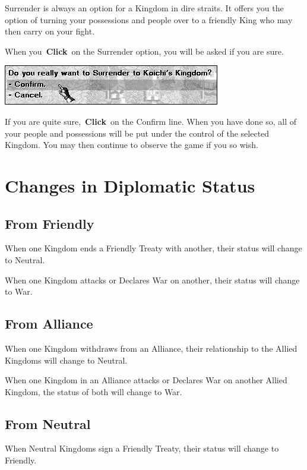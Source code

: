 Surrender is always an option for a Kingdom in dire straits. It offers you the option of turning your possessions and people over to a friendly King who may then carry on your fight.

When you \textbf{Click} on the Surrender option, you will be asked if you are sure.

\begin{center}
	\includegraphics[width=0.7\linewidth]{Isurrender_responce}
\end{center}

If you are quite sure, \textbf{Click} on the Confirm line. When you have done so, all of your people and possessions will be put under the control of the selected Kingdom. You may then continue to observe the game if you so wish.

\section{Changes in Diplomatic Status}

\subsection{From Friendly}

When one Kingdom ends a Friendly Treaty with another, their status will change to Neutral.

When one Kingdom attacks or Declares War on another, their status will change to War.

\subsection{From Alliance}

When one Kingdom withdraws from an Alliance, their relationship to the Allied Kingdoms will change to Neutral.

When one Kingdom in an Alliance attacks or Declares War on another Allied Kingdom, the status of both will change to War.

\subsection{From Neutral}

When Neutral Kingdoms sign a Friendly Treaty, their status will change to Friendly.

